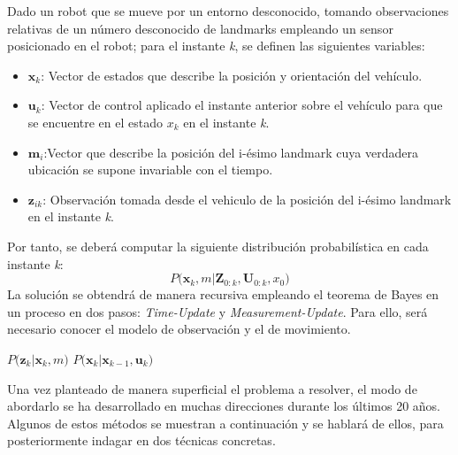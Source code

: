 Dado un robot que se mueve por un entorno desconocido, tomando observaciones relativas de un número desconocido de landmarks empleando un sensor posicionado
en el robot; para el instante \textit{k}, se definen las siguientes variables:
\begin{itemize}
    \item $\textbf{x}_k$: Vector de estados que describe la posición y orientación del vehículo.
    \item $\textbf{u}_k$: Vector de control aplicado el instante anterior sobre el vehículo para que se encuentre
en el estado $\textit{x}_k$ en el instante \textit{k}.
    \item $\textbf{m}_i$:Vector que describe la posición del i-ésimo landmark cuya verdadera ubicación se supone invariable con el tiempo.
    \item $\textbf{z}_{ik}$: Observación tomada desde el vehiculo de la posición del i-ésimo landmark en el instante \textit{k}.
\end{itemize}
Por tanto, se deberá computar la siguiente distribución probabilística en cada instante \textit{k}:
\begin{equation}
    P\Big( \textbf{x}_k ,m | \textbf{Z}_{0:k},\textbf{U}_{0:k},x_0\Big)
\end{equation}
La solución se obtendrá de manera recursiva empleando el teorema de Bayes en un proceso en dos pasos: \textit{Time-Update} y \textit{Measurement-Update}. Para ello,
será necesario conocer el modelo de observación y el de movimiento. \\

\begin{center}
    $P\Big( \textbf{z}_k | \textbf{x}_{k},m \Big)$ \hspace{2cm} $P\Big( \textbf{x}_k | \textbf{x}_{k-1},\textbf{u}_{k} \Big)$
\end{center}

Una vez planteado de manera superficial el problema a resolver, el modo de abordarlo se ha desarrollado en muchas direcciones durante los últimos 20 años. \\
Algunos de estos métodos se muestran a continuación y se hablará de ellos, para posteriormente indagar en dos técnicas concretas.
